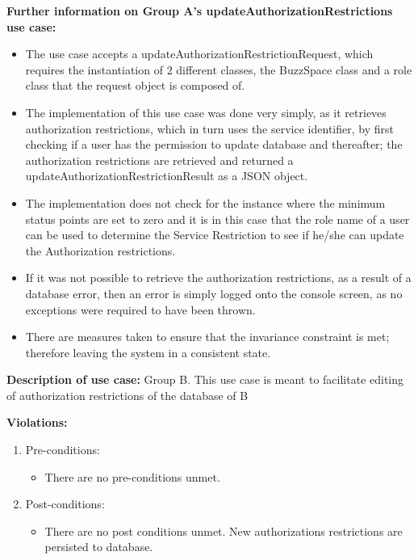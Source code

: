 \textbf{Further information on Group A's updateAuthorizationRestrictions
 use case:}
\begin{itemize}
	\item The use case accepts a updateAuthorizationRestrictionRequest, which requires the instantiation of 2 different classes, the BuzzSpace class and a role class that the request object is composed of.

\item The implementation of this use case was done very simply, as it retrieves authorization restrictions, which in turn uses the service identifier,  by first checking if a user has the permission to update database and thereafter; the authorization restrictions are retrieved and returned a updateAuthorizationRestrictionResult as a JSON object.

\item The implementation does not check for the instance where the minimum status points are set to zero and it is in this case that the role name of a user can be used to determine the Service Restriction to see if he/she can update the Authorization restrictions.

\item If it was not possible to retrieve the authorization restrictions, as a result of a database error, then an error is simply logged onto the console screen, as no exceptions were required to have been thrown.

\item There are measures taken to ensure that the invariance constraint is met; therefore leaving the system in a consistent state.

\end{itemize}

\textbf{Description of use case:}\newline
Group B.
This use case is meant to facilitate editing of authorization restrictions of the database of B
\medskip

\textbf{Violations:}
\begin{enumerate}

	\item Pre-conditions:
	\begin{itemize}
		\item There are no pre-conditions unmet. 
	\end{itemize}
	
	\item Post-conditions:
	\begin{itemize}
		\item There are no post conditions unmet. New authorizations restrictions are persisted to database.
	\end{itemize}
		
\end{enumerate}

